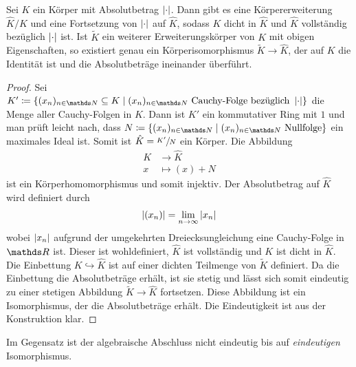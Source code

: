 \begin{satz}
Sei $K$ ein Körper mit Absolutbetrag $\left\vert\cdot\right\vert$.
Dann gibt es eine Körpererweiterung $\hat{K}/K$ und eine Fortsetzung von $\left\vert\cdot\right\vert$ auf $\hat{K}$, sodass $K$ dicht in $\hat{K}$ und $\hat{K}$ vollständig bezüglich $\left\vert\cdot\right\vert$ ist.
Ist $\tilde{K}$ ein weiterer Erweiterungskörper von $K$ mit obigen Eigenschaften,
so existiert genau ein Körperisomorphismus $\tilde{K}\to \hat{K}$, der auf $K$ die Identität ist
und die Absolutbeträge ineinander überführt.
\begin{proof}
Sei $K'\coloneqq\{(x_n)_{n\in \N}\subseteq K \mid (x_n)_{n\in \N} \text{ Cauchy-Folge bezüglich } \abs{\cdot}\}$ die Menge aller Cauchy-Folgen in $K$.
Dann ist $K'$ ein kommutativer Ring mit $1$ und man prüft leicht nach, dass $N\coloneqq\{(x_n)_{n\in \N}\mid (x_n)_{n\in \N} \text{ Nullfolge}\}$
ein maximales Ideal ist.
Somit ist $\hat{K}=\sfrac{K'}{N}$ ein Körper. Die Abbildung
\begin{align*}
K &\to \hat{K}\\
x &\mapsto (x)+N
\end{align*}
ist ein Körperhomomorphismus und somit injektiv.
Der Absolutbetrag auf $\hat{K}$ wird definiert durch
\begin{align*}
\left\vert(x_n)\right\vert=\lim_{n\to \infty} \left\vert x_n\right\vert
\end{align*}
wobei $\left\vert x_n\right\vert$ aufgrund der umgekehrten Dreiecksungleichung eine Cauchy-Folge in $\R$ ist.
Dieser ist wohldefiniert, $\hat{K}$ ist vollständig und $K$ ist dicht in $\hat{K}$.
Die Einbettung $K \hookrightarrow \hat{K}$ ist auf einer dichten Teilmenge von $\tilde{K}$ definiert.
Da die Einbettung die Absolutbeträge erhält, ist sie stetig und lässt sich somit eindeutig zu einer stetigen Abbildung $\tilde{K}\to \hat{K}$ fortsetzen.
Diese Abbildung ist ein Isomorphismus, der die Absolutbeträge erhält.
Die Eindeutigkeit ist aus der Konstruktion klar.
\end{proof}
\end{satz}

\begin{bem}
Im Gegensatz ist der algebraische Abschluss nicht eindeutig bis auf \emph{eindeutigen} Isomorphismus.
\end{bem}